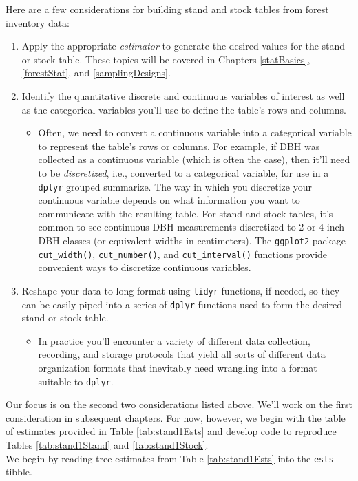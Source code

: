 \documentclass[
  11pt,
]{krantz}
\providecommand{\tightlist}{%
  \setlength{\itemsep}{0pt}\setlength{\parskip}{0pt}}
\theoremstyle{definition}
\theoremstyle{definition}
\theoremstyle{definition}
\theoremstyle{definition}
\theoremstyle{remark}
\begin{document}
Here are a few considerations for building stand and stock tables from forest inventory data:

\begin{enumerate}
\def\labelenumi{\arabic{enumi}.}
\tightlist
\item
  Apply the appropriate \emph{estimator} to generate the desired values for the stand or stock table. These topics will be covered in Chapters \ref{statBasics}, \ref{forestStat}, and \ref{samplingDesigns}.
\item
  Identify the quantitative discrete and continuous variables of interest as well as the categorical variables you'll use to define the table's rows and columns.

  \begin{itemize}
  \tightlist
  \item
    Often, we need to convert a continuous variable into a categorical variable to represent the table's rows or columns. For example, if DBH was collected as a continuous variable (which is often the case), then it'll need to be \emph{discretized}, i.e., converted to a categorical variable, for use in a \texttt{dplyr} grouped summarize. The way in which you discretize your continuous variable depends on what information you want to communicate with the resulting table. For stand and stock tables, it's common to see continuous DBH measurements discretized to 2 or 4 inch DBH classes (or equivalent widths in centimeters). The \texttt{ggplot2} package \texttt{cut\_width()}, \texttt{cut\_number()}, and \texttt{cut\_interval()} functions provide convenient ways to discretize continuous variables.\\
  \end{itemize}
\item
  Reshape your data to long format using \texttt{tidyr} functions, if needed, so they can be easily piped into a series of \texttt{dplyr} functions used to form the desired stand or stock table.

  \begin{itemize}
  \tightlist
  \item
    In practice you'll encounter a variety of different data collection, recording, and storage protocols that yield all sorts of different data organization formats that inevitably need wrangling into a format suitable to \texttt{dplyr}.
  \end{itemize}
\end{enumerate}

Our focus is on the second two considerations listed above. We'll work on the first consideration in subsequent chapters. For now, however, we begin with the table of estimates provided in Table \ref{tab:stand1Ests} and develop code to reproduce Tables \ref{tab:stand1Stand} and \ref{tab:stand1Stock}.\\
We begin by reading tree estimates from Table \ref{tab:stand1Ests} into the \texttt{ests} tibble.
\end{document}
